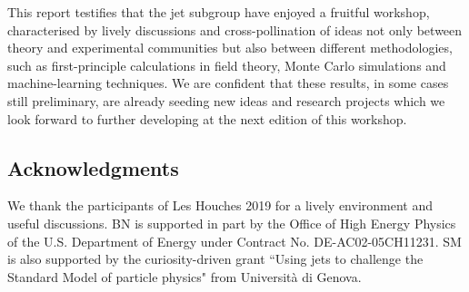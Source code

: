 \documentclass[11pt]{cernrep}
\begin{document}
This report testifies that the jet subgroup have enjoyed a fruitful workshop, characterised by lively discussions and cross-pollination of ideas not only between theory and experimental communities but also between different methodologies, such as first-principle calculations in field theory, Monte Carlo simulations and machine-learning techniques. 
%
We are confident that these results, in some cases still preliminary, are already seeding new ideas and research projects which we look forward to further developing at the next edition of this workshop. 	



\subsection*{Acknowledgments}

We thank the participants of Les Houches 2019 for a lively environment and useful discussions.
BN is supported in part by the Office of High Energy Physics of the U.S. Department of Energy under Contract No. DE-AC02-05CH11231.
%
SM is also supported by the curiosity-driven grant ``Using jets to challenge the Standard Model of particle physics" from Universit\`a di Genova.


\end{document}
